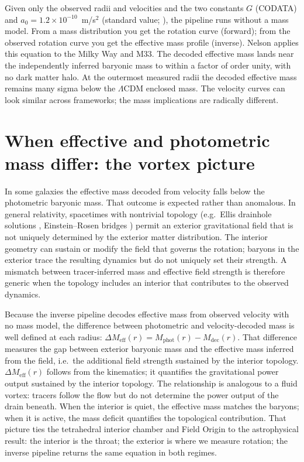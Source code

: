 \documentclass[aps,twocolumn,amsmath,amssymb,reprint,nofootinbib,nobalancelastpage]{revtex4-2}
\begin{document}
Given only the observed radii and velocities and the two constants $G$ (CODATA) and $a_0 = 1.2\times10^{-10}$~m/s$^2$ (standard value; \cite{Milgrom83}), the pipeline runs without a mass model. From a mass distribution you get the rotation curve (forward); from the observed rotation curve you get the effective mass profile (inverse). Nelson \cite{Nelson2026} applies this equation to the Milky Way and M33. The decoded effective mass lands near the independently inferred baryonic mass to within a factor of order unity, with no dark matter halo. At the outermost measured radii the decoded effective mass remains many sigma below the $\Lambda$CDM enclosed mass. The velocity curves can look similar across frameworks; the mass implications are radically different.

\section{When effective and photometric mass differ: the vortex picture}
\label{sec:vortex}

In some galaxies the effective mass decoded from velocity falls below the photometric baryonic mass. That outcome is expected rather than anomalous. In general relativity, spacetimes with nontrivial topology (e.g.\ Ellis drainhole solutions \cite{Ellis73}, Einstein--Rosen bridges \cite{Einstein35}) permit an exterior gravitational field that is not uniquely determined by the exterior matter distribution. The interior geometry can sustain or modify the field that governs the rotation; baryons in the exterior trace the resulting dynamics but do not uniquely set their strength. A mismatch between tracer-inferred mass and effective field strength is therefore generic when the topology includes an interior that contributes to the observed dynamics.

Because the inverse pipeline decodes effective mass from observed velocity with no mass model, the difference between photometric and velocity-decoded mass is well defined at each radius: $\Delta M_{\mathrm{eff}}(r) = M_{\mathrm{phot}}(r) - M_{\mathrm{dec}}(r)$. That difference measures the gap between exterior baryonic mass and the effective mass inferred from the field, i.e.\ the additional field strength sustained by the interior topology. $\Delta M_{\mathrm{eff}}(r)$ follows from the kinematics; it quantifies the gravitational power output sustained by the interior topology. The relationship is analogous to a fluid vortex: tracers follow the flow but do not determine the power output of the drain beneath. When the interior is quiet, the effective mass matches the baryons; when it is active, the mass deficit quantifies the topological contribution. That picture ties the tetrahedral interior chamber and Field Origin to the astrophysical result: the interior is the throat; the exterior is where we measure rotation; the inverse pipeline returns the same equation in both regimes.
\end{document}
